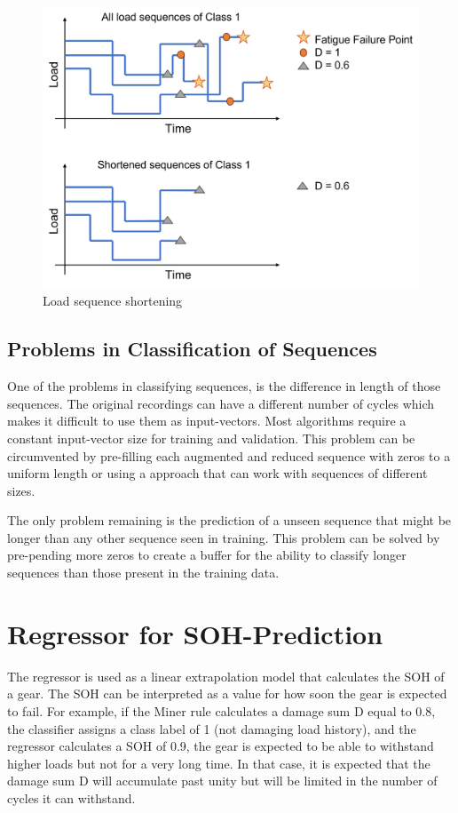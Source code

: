 \begin{figure}[H]
	\centering
	\includegraphics[width=0.8\linewidth]{IMGs/Shortened.png}
	\caption{Load sequence shortening}
	\label{fig:Shortened}
\end{figure}

\subsection{Problems in Classification of Sequences}
One of the problems in classifying sequences, is the difference in length of those sequences. The original recordings can have a different number of cycles which makes it difficult to use them as input-vectors. Most algorithms require a constant input-vector size for training and validation. This problem can be circumvented by pre-filling each augmented and reduced sequence with zeros to a uniform length or using a approach that can work with sequences of different sizes. 


The only problem remaining is the prediction of a unseen sequence that might be longer than any other sequence seen in training.
This problem can be solved by pre-pending more zeros to create a buffer for the ability to classify longer sequences than those present in the training data.


\newpage
\section{Regressor for SOH-Prediction}
The regressor is used as a linear extrapolation model that calculates the SOH of a gear. The SOH can be interpreted as a value for how soon the gear is expected to fail. For example, if the Miner rule calculates a damage sum D equal to 0.8, the classifier assigns a class label of 1 (not damaging load history), and the regressor calculates a SOH of 0.9, the gear is expected to be able to withstand higher loads but not for a very long time. In that case, it is expected that the damage sum D will accumulate past unity but will be limited in the number of cycles it can withstand. 

